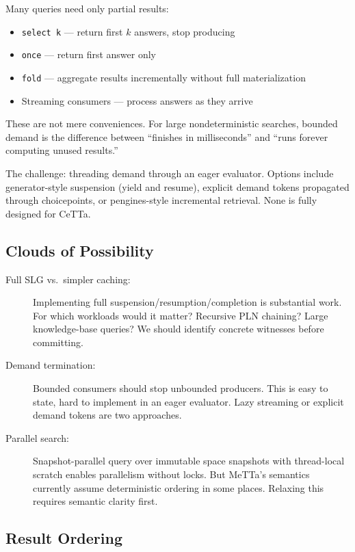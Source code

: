 \documentclass[11pt]{article}
\newcommand{\code}[1]{\texttt{#1}}
\newcommand{\CeTTa}{\textup{CeTTa}}
\begin{document}
Many queries need only partial results:
\begin{itemize}
\item \code{select k} --- return first $k$ answers, stop producing
\item \code{once} --- return first answer only
\item \code{fold} --- aggregate results incrementally without full materialization
\item Streaming consumers --- process answers as they arrive
\end{itemize}

These are not mere conveniences.  For large nondeterministic searches,
bounded demand is the difference between ``finishes in milliseconds'' and
``runs forever computing unused results.''

The challenge: threading demand through an eager evaluator.  Options include
generator-style suspension (yield and resume), explicit demand tokens
propagated through choicepoints, or pengines-style incremental retrieval.
None is fully designed for \CeTTa{}.

\subsection{Clouds of Possibility}

\begin{description}
\item[Full SLG vs.\ simpler caching:]
  Implementing full suspension/resumption/completion is substantial work.
  For which workloads would it matter?  Recursive PLN chaining?  Large
  knowledge-base queries?  We should identify concrete witnesses before
  committing.
\item[Demand termination:]
  Bounded consumers should stop unbounded producers.  This is easy to
  state, hard to implement in an eager evaluator.  Lazy streaming or
  explicit demand tokens are two approaches.
\item[Parallel search:]
  Snapshot-parallel query over immutable space snapshots with thread-local
  scratch enables parallelism without locks.  But MeTTa's semantics
  currently assume deterministic ordering in some places.  Relaxing this
  requires semantic clarity first.
\end{description}

\subsection{Result Ordering}
\end{document}
